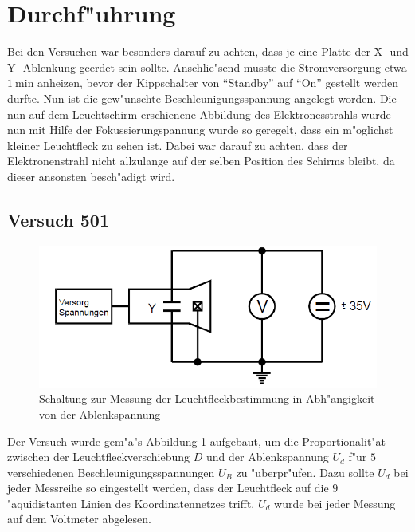 \section{Durchf"uhrung}
	\label{sec:durchfuehrung}

		Bei den Versuchen war besonders darauf zu achten, dass je eine Platte der X- und Y- Ablenkung geerdet sein sollte. 
		Anschlie"send musste die Stromversorgung etwa $\SI{1}{\minute}$ anheizen, bevor der Kippschalter von "`Standby"' auf "`On"' gestellt werden durfte.
		Nun ist die gew"unschte Be\-schleu\-ni\-gungs\-span\-nun\-g angelegt worden.
		Die nun auf dem Leuchtschirm erschienene Abbildung des Elektronesstrahls wurde nun mit Hilfe der Fokussierungspannung wurde so geregelt, dass ein m"oglichst kleiner Leuchtfleck zu sehen ist.
		Dabei war darauf zu achten, dass der Elektronenstrahl nicht allzulange auf der selben Position des Schirms bleibt, da dieser ansonsten besch"adigt wird.

		\subsection{Versuch 501}
		\label{sub:501}

		\begin{figure}[h]
			\centering
			\includegraphics[width = 14cm]{img/501a.png}
			\caption{Schaltung zur Messung der Leuchtfleckbestimmung in Abh"angigkeit von der Ablenkspannung}
			\label{501a}
		\end{figure}

		Der Versuch wurde gem"a"s Abbildung \ref{501a} aufgebaut, um die Proportionalit"at zwischen der Leuchtfleckverschiebung $D$ und der Ablenkspannung $U_d$ f"ur $5$ verschiedenen Be\-schleu\-ni\-gungs\-span\-nun\-gen $U_B$ zu "uberpr"ufen. 
		Dazu sollte $U_d$ bei jeder Messreihe so eingestellt werden, dass der Leuchtfleck auf die $9$ "aquidistanten Linien des Koordinatennetzes trifft.
		$U_d$ wurde bei jeder Messung auf dem Voltmeter abgelesen.

